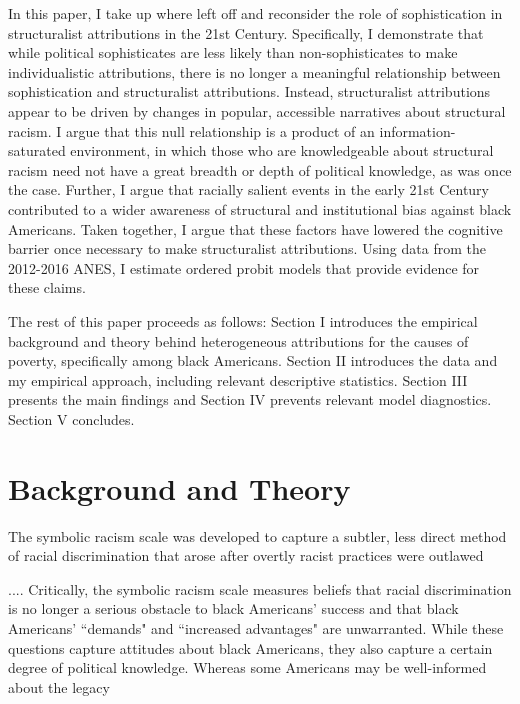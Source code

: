 \documentclass[12pt]{paper}
\begin{document}
In this paper, I take up where \cite{gomez_rethinking_2006} left off and reconsider the role of sophistication in structuralist attributions in the 21st Century. Specifically, I demonstrate that  while political sophisticates are less likely than non-sophisticates to make individualistic attributions, there is no longer a meaningful relationship between sophistication and structuralist attributions. Instead, structuralist attributions appear to be driven by changes in popular, accessible narratives about structural racism. I argue that this null relationship is a product of an information-saturated environment, in which those who are knowledgeable about structural racism need not have a great breadth or depth of political knowledge, as was once the case. Further, I argue that racially salient events in the early 21st Century contributed to a wider awareness of structural and institutional bias against black Americans. Taken together, I argue that these factors have lowered the cognitive barrier once necessary to make structuralist attributions. Using data from the 2012-2016 ANES, I estimate ordered probit models that provide evidence for these claims.

The rest of this paper proceeds as follows: Section I introduces the empirical background and theory behind heterogeneous attributions for the causes of poverty, specifically among black Americans. Section II introduces the data and my empirical approach, including relevant descriptive statistics. Section III presents the main findings and Section IV prevents relevant model diagnostics. Section V concludes.



\section{Background and Theory}
The symbolic racism scale was developed to capture a subtler, less direct method of racial discrimination that arose after overtly racist practices were outlawed 


.... Critically, the symbolic racism scale measures beliefs that racial discrimination is no longer a serious obstacle to black Americans' success and that black Americans' ``demands" and ``increased advantages" are unwarranted. While these questions capture attitudes about black Americans, they also capture a certain degree of political knowledge. Whereas some Americans may be well-informed about the legacy 
\end{document}
